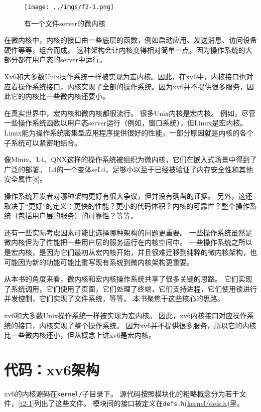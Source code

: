 \begin{figure}[htbp]
    \centering
    \texttt{[image: ../imgs/f2-1.png]}
    \caption{有一个文件server的微内核}
    \label{f2-1}
\end{figure}

在微内核中，内核的接口由一些底层的函数，例如启动应用、发送消息、访问设备硬件等等，组合而成。
这种架构会让内核变得相对简单一点，因为操作系统的大部分都在用户态的server中运行。

Xv6和大多数Unix操作系统一样被实现为宏内核。因此，在xv6中，内核接口也对应着操作系统接口，内核实现了全部的操作系统。因为xv6并不提供很多服务，因此它的内核比一些微内核还要小。

在真实世界中，宏内核和微内核都很流行。
很多Unix内核是宏内核。
例如，尽管一些操作系统函数以用户态server运行（例如，窗口系统），但Linux是宏内核。
Linux能为操作系统密集型应用程序提供很好的性能，一部分原因就是内核的各个子系统可以紧密地结合。

像Minix、L4、QNX这样的操作系统被组织为微内核，它们在嵌入式场景中得到了广泛的部署。
L4的一个变体seL4，足够小以至于已经被验证了内存安全性和其他安全属性[8]。

操作系统开发者对哪种架构更好有很大争议，但并没有确凿的证据。
另外，这还取决于“更好”的定义：更快的性能？更小的代码体积？内核的可靠性？整个操作系统（包括用户层的服务）的可靠性？等等。

还有一些实际考虑因素可能比选择哪种架构的问题更重要。
一些操作系统虽然是微内核但为了性能把一些用户层的服务运行在内核空间中。
一些操作系统之所以是宏内核，是因为它们最初从宏内核开始，并且很难迁移到纯粹的微内核架构，也可能因为新的功能可能比重写现有系统到微内核架构更重要。

从本书的角度来看，微内核和宏内核操作系统共享了很多关键的思路。
它们实现了系统调用，它们使用了页面，它们处理了终端，它们支持进程，它们使用锁进行并发控制，它们实现了文件系统，等等。
本书聚焦于这些核心的思路。

xv6和大多数Unix操作系统一样被实现为宏内核。
因此，xv6内核接口对应操作系统的接口，内核实现了整个操作系统。
因为xv6并不提供很多服务，所以它的内核比一些微内核还小，但从概念上讲xv6是宏内核。

\section{代码：xv6架构}
xv6的内核源码在\texttt{kernel/}子目录下。
源代码按照模块化的粗略概念分为若干文件，\autoref{t2-1}列出了这些文件。
模块间的接口被定义在\texttt{defs.h}\href{https://github.com/mit-pdos/xv6-riscv/blob/riscv/kernel/defs.h}{(kernel/defs.h)}里。

